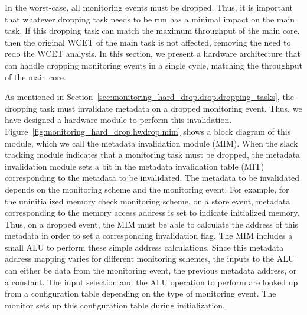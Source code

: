 In the worst-case, all monitoring events must be dropped. Thus, it is important
that whatever dropping task needs to be run has a minimal impact on the main
task. If this dropping task can match the maximum throughput of the main core,
then the original WCET of the main task is not affected, removing the need to
redo the WCET analysis. In this section, we present a hardware architecture
that can handle dropping monitoring events in a single cycle, matching the
throughput of the main core.

As mentioned in Section~\ref{sec:monitoring_hard_drop.drop.dropping_tasks}, the dropping task must
invalidate metadata on a dropped monitoring event.  Thus, we have designed a
hardware module to perform this invalidation. Figure~\ref{fig:monitoring_hard_drop.hwdrop.mim} shows
a block diagram of this module, which we call the metadata invalidation module
(MIM).  When the slack tracking module indicates that a monitoring task must be
dropped, the metadata invalidation module sets a bit in the metadata
invalidation table (MIT) corresponding to the metadata to be invalidated.  The
metadata to be invalidated depends on the monitoring scheme and the monitoring
event. For example, for the uninitialized memory check monitoring scheme, on a
store event, metadata corresponding to the memory access address is set to
indicate initialized memory. Thus, on a dropped event, the MIM must be able to
calculate the address of this metadata in order to set a corresponding
invalidation flag.  The MIM includes a small ALU to perform these simple
address calculations. Since this metadata address mapping varies for different
monitoring schemes, the inputs to the ALU can either be data from the
monitoring event, the previous metadata address, or a constant. The input
selection and the ALU operation to perform are looked up from a configuration
table depending on the type of monitoring event.  The monitor sets up this
configuration table during initialization.

